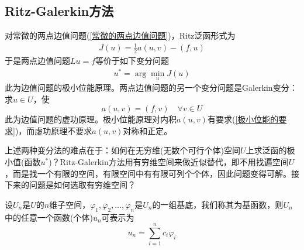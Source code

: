     \subsection{Ritz-Galerkin方法}
        \label{subsec:Ritz-Galerkin方法}
        \par
        对常微的两点边值问题(\ref{常微的两点边值问题})，Ritz泛函形式为
        \begin{align*}
            J(u) = \frac{1}{2}a(u,v) - (f,u)
        \end{align*}
        于是两点边值问题$Lu = f$等价于如下变分问题
        \begin{align*}
            u^* = \arg\min_u J(u)
        \end{align*}
        此为边值问题的极小位能原理。两点边值问题的另一个变分问题是Galerkin变分：求$u\in U$，使
        \[
            a(u,v) = (f,v) \quad \forall v\in U
        \]
        此为边值问题的虚功原理。极小位能原理对内积$a(u,v)$有要求(\ref{极小位能的要求})，而虚功原理不要求$a(u,v)$对称和正定。
        \par
        上述两种变分法的难点在于：如何在无穷维(无数个可行个体)空间$U$上求泛函的极小值(函数$u^*$)？Ritz-Galerkin方法用有穷维空间来做近似替代，即不用找遍空间$U$，而是找一个有限的空间，有限空间中有有限可列个个体，因此问题变得可解。接下来的问题是如何选取有穷维空间？
        \par
        设$U_n$是$U$的$n$维子空间，$\varphi_1,\varphi_2,\dots,\varphi_n$是$U_n$的一组基底，我们称其为基函数，则$U_n$中的任意一个函数(个体)$u_n$可表示为
        \[
            u_n = \sum_{i = 1}^n c_i \varphi_i
        \]
